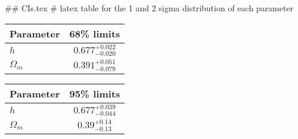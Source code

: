 ## CIs.tex
# latex table for the 1 and 2 sigma distribution of each parameter

\begin{tabular} { l  c}
 Parameter &  68\% limits\\
\hline
{\boldmath$h              $} & $0.677^{+0.022}_{-0.020}   $\\
{\boldmath$\Omega_m       $} & $0.391^{+0.051}_{-0.079}   $\\
\hline
\end{tabular}

\begin{tabular} { l  c}
 Parameter &  95\% limits\\
\hline
{\boldmath$h              $} & $0.677^{+0.039}_{-0.044}   $\\
{\boldmath$\Omega_m       $} & $0.39^{+0.14}_{-0.13}      $\\
\hline
\end{tabular}
